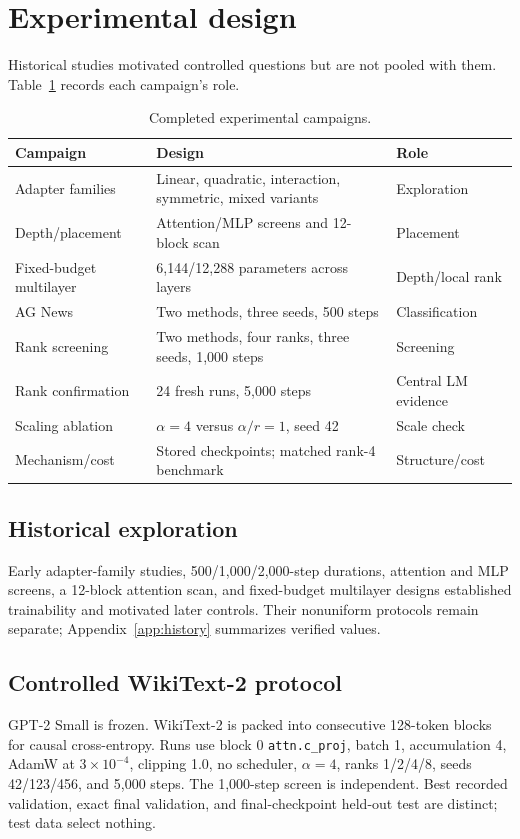 \documentclass[11pt]{article}
\begin{document}
\FloatBarrier\section{Experimental design}
Historical studies motivated controlled questions but are not pooled with them. Table~\ref{tab:campaigns} records each campaign's role.
\begin{table}[ht]\centering\small
\caption{Completed experimental campaigns.}\label{tab:campaigns}
\begin{tabular}{p{.2\linewidth}p{.49\linewidth}p{.21\linewidth}}\toprule
Campaign&Design&Role\\\midrule
Adapter families&Linear, quadratic, interaction, symmetric, mixed variants&Exploration\\
Depth/placement&Attention/MLP screens and 12-block scan&Placement\\
Fixed-budget multilayer&6,144/12,288 parameters across layers&Depth/local rank\\
AG News&Two methods, three seeds, 500 steps&Classification\\
Rank screening&Two methods, four ranks, three seeds, 1,000 steps&Screening\\
Rank confirmation&24 fresh runs, 5,000 steps&Central LM evidence\\
Scaling ablation&$\alpha=4$ versus $\alpha/r=1$, seed 42&Scale check\\
Mechanism/cost&Stored checkpoints; matched rank-4 benchmark&Structure/cost\\\bottomrule
\end{tabular}\end{table}

\subsection{Historical exploration} Early adapter-family studies, 500/1,000/2,000-step durations, attention and MLP screens, a 12-block attention scan, and fixed-budget multilayer designs established trainability and motivated later controls. Their nonuniform protocols remain separate; Appendix~\ref{app:history} summarizes verified values.

\subsection{Controlled WikiText-2 protocol} GPT-2 Small is frozen. WikiText-2 is packed into consecutive 128-token blocks for causal cross-entropy. Runs use block 0 \texttt{attn.c\_proj}, batch 1, accumulation 4, AdamW at $3\times10^{-4}$, clipping 1.0, no scheduler, $\alpha=4$, ranks 1/2/4/8, seeds 42/123/456, and 5,000 steps. The 1,000-step screen is independent. Best recorded validation, exact final validation, and final-checkpoint held-out test are distinct; test data select nothing.
\end{document}
